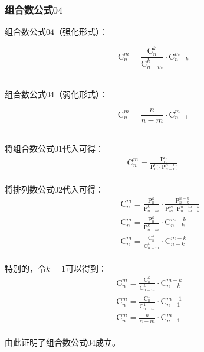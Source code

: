 \documentclass[UTF8]{ctexart}
\newcommand{\Pe}{\mathrm{P}}
\newcommand{\Co}{\mathrm{C}}
\begin{document}
\subsubsection{组合数公式$04$}
    组合数公式$04$（强化形式）：
    \begin{large}
        \begin{equation*}
            \Co_n^m=\frac{\Co_n^k}{\Co_{n-m}^k}\cdot\Co_{n-k}^m
        \end{equation*}
    \end{large}\\
    组合数公式$04$（弱化形式）：
    \begin{large}
        \begin{equation*}
            \Co_n^m=\frac{n}{n-m}\cdot\Co_{n-1}^m
        \end{equation*}
    \end{large}\\
    将组合数公式$01$代入可得：
    \setcounter{equation}{0}
    \begin{align}
        \Co_n^m=\frac{\Pe_n^n}{\Pe_m^m\cdot\Pe_{n-m}^{n-m}}~
    \end{align}\\
    将排列数公式$02$代入可得：
    \begin{align}
        &~~~~\Co_n^m=\frac{\Pe_n^k}{\Pe_{n-m}^k}\cdot\frac{\Pe_{n-k}^{n-k}}{\Pe_{m}^{m}\cdot\Pe_{n-m-k}^{n-m-k}}\\[3mm]
        &~~~~\Co_n^m=\frac{\Pe_n^k}{\Pe_{n-m}^k}\cdot\Co_{n-k}^{m-k}\\[3mm]
        &~~~~\Co_n^m=\frac{\Co_n^k}{\Co_{n-m}^k}\cdot\Co_{n-k}^{m-k}
    \end{align}\\
    特别的，令$k=1$可以得到：
    \begin{align}
        &\Co_n^m=\frac{\Co_n^k}{\Co_{n-m}^k}\cdot\Co_{n-k}^{m-k}~~~~~~~~\\[3mm]
        &\Co_n^m=\frac{\Co_n^1}{\Co_{n-m}^1}\cdot\Co_{n-1}^{m-1}\\[3mm]
        &\Co_n^m=\frac{n}{n-m}\cdot\Co_{n-1}^{m}
    \end{align}\\
    由此证明了组合数公式$04$成立。
    
\newpage
\end{document}
